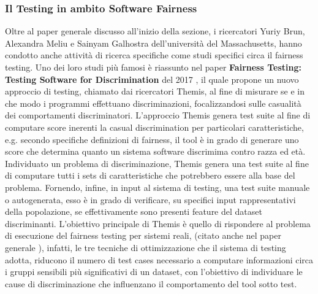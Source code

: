 \subsubsection{Il Testing in ambito Software Fairness}
Oltre al paper generale \cite{brun2018software} discusso all'inizio della sezione, i ricercatori Yuriy Brun, Alexandra Meliu e Sainyam Galhostra dell'università del Massachusetts, hanno condotto anche attività di ricerca specifiche come studi specifici circa il fairness testing. Uno dei loro studi più famosi è riassunto nel paper \textbf{Fairness Testing: Testing Software for Discrimination} del 2017 \cite{galhotra2017fairness}, il quale propone un nuovo approccio di testing, chiamato dai ricercatori Themis, al fine di misurare se e in che modo i programmi effettuano discriminazioni, focalizzandosi sulle casualità dei comportamenti discriminatori. L'approccio Themis genera test suite al fine di computare score inerenti la casual discrimination per particolari caratteristiche, e.g. secondo specifiche definizioni di fairness, il tool è in grado di generare uno score che determina quanto un sistema software discrimima contro razza ed età. Individuato un problema di discriminazione, Themis genera una test suite al fine di computare tutti i sets di caratteristiche che potrebbero essere alla base del problema. Fornendo, infine, in input al sistema di testing, una test suite manuale o autogenerata, esso è in grado di verificare, su specifici input rappresentativi della popolazione, se effettivamente sono presenti feature del dataset discriminanti. L'obiettivo principale di Themis è quello di rispondere al problema di esecuzione del fairness testing per sistemi reali, (citato anche nel paper generale \cite{brun2018software}), infatti, le tre tecniche di ottimizzazione che il sistema di testing adotta, riducono il numero di test cases necessario a computare informazioni circa i gruppi sensibili più significativi di un dataset, con l'obiettivo di individuare le cause di discriminazione che influenzano il comportamento del tool sotto test.

